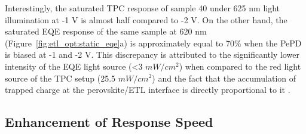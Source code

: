 Interestingly, the saturated TPC response of sample 40 under 625 nm light illumination at -1 V is almost half compared to -2 V. On the other hand, the saturated EQE response of the same sample at 620 nm (Figure~\ref{fig:etl_opt:static_eqe}a) is approximately equal to 70\% when the PePD is biased at -1 and -2 V. This discrepancy is attributed to the significantly lower intensity of the EQE light source (<3 $mW/cm^2$) when compared to the red light source of the TPC setup (25.5 $mW/cm^2$) and the fact that the accumulation of trapped charge at the perovskite/ETL interface is directly proportional to it \cite{Hwang2009Drift-diffusionCells,Mcneill2009PhotocurrentEffects}.

\subsection{Enhancement of Response Speed}

